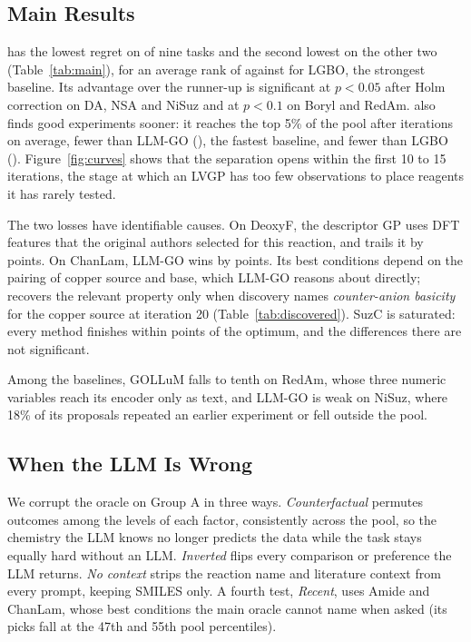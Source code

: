 \subsection{Main Results}
\label{sec:main}

\ours{} has the lowest regret on \NWins{} of nine tasks and the second lowest on the other two (Table~\ref{tab:main}), for an average rank of \RankTacit{} against \RankLGBO{} for LGBO, the strongest baseline. Its advantage over the runner-up is significant at $p<0.05$ after Holm correction on DA, NSA and NiSuz and at $p<0.1$ on Boryl and RedAm. \ours{} also finds good experiments sooner: it reaches the top 5\% of the pool after \ITacit{} iterations on average, \IReduction{} fewer than LLM-GO (\IFast{}), the fastest baseline, and \IReductionRank{} fewer than LGBO (\ILGBO{}). Figure~\ref{fig:curves} shows that the separation opens within the first 10 to 15 iterations, the stage at which an LVGP has too few observations to place reagents it has rarely tested.

The two losses have identifiable causes. On DeoxyF, the descriptor GP uses DFT features that the original authors selected for this reaction, and \ours{} trails it by \GapDeoxyF{} points. On ChanLam, LLM-GO wins by \GapChanLam{} points. Its best conditions depend on the pairing of copper source and base, which LLM-GO reasons about directly; \ours{} recovers the relevant property only when discovery names \emph{counter-anion basicity} for the copper source at iteration 20 (Table~\ref{tab:discovered}). SuzC is saturated: every method finishes within \SuzCMax{} points of the optimum, and the differences there are not significant.

Among the baselines, GOLLuM falls to tenth on RedAm, whose three numeric variables reach its encoder only as text, and LLM-GO is weak on NiSuz, where 18\% of its proposals repeated an earlier experiment or fell outside the pool.

\subsection{When the LLM Is Wrong}
\label{sec:robust}



We corrupt the oracle on Group A in three ways. \emph{Counterfactual} permutes outcomes among the levels of each factor, consistently across the pool, so the chemistry the LLM knows no longer predicts the data while the task stays equally hard without an LLM. \emph{Inverted} flips every comparison or preference the LLM returns. \emph{No context} strips the reaction name and literature context from every prompt, keeping SMILES only. A fourth test, \emph{Recent}, uses Amide and ChanLam, whose best conditions the main oracle cannot name when asked (its picks fall at the 47th and 55th pool percentiles).

